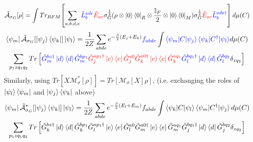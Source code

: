 \documentclass[aps,floatfix,10pt,amssymb,amsfont,amsmath,superscriptaddress,float,nofootinbib,longbibliography,nobalancelastpage,twocolumn]{revtex4-2}
\begin{document}
    \begin{equation}
    \tilde{\mathcal{A}}_{\sigma_G}[\rho] = \int Tr_{RFM}\!\left[\sum_{a,b,d,e}\textcolor{blue}{\tilde L^{ade}_b} \textcolor{red}{\tilde E_{ae}} \sigma_G^{\frac{1}{2}} (\rho\otimes \ket{0}\bra{0}_R \otimes \frac{\mathbb{I}_F}{2}\otimes \ket{0}\bra{0}_M) \sigma_G^{\frac{1}{2}}\textcolor{red}{\tilde E_{ae}}\textcolor{blue}{\tilde L^{ade\dagger}_b}\right] d\mu(C)
\end{equation}
\begin{multline}
    \bra{\psi_m}\tilde{\mathcal{A}}_{\sigma_G}[\ket{\psi_j}\bra{\psi_k}]\ket{\psi_l}=\frac{1}{2Z} \sum_{abde} e^{-\frac{\beta}{2}(E_j+E_k)}\textcolor{blue}{f_{abde}} \int \textcolor{blue}{\braket{\psi_m|C|\psi_j}\braket{\psi_k|C^{\dagger}|\psi_l}} d\mu(C)\\\sum_{p_1zq_1 q_2}Tr\left[\textcolor{blue}{\tilde G^{bz\dagger}_m\ket{d}\bra{d}\tilde G^{bp_1}_m} \textcolor{red}{\tilde G_j^{ap_1\dagger}\ket{e}\bra{e}\tilde G_j^{a0}\tilde G_k^{a0\dagger}\ket{e}\bra{e}\tilde G_k^{aq_1}} \textcolor{blue}{\tilde G^{bq_1\dagger}_l\ket{d}\bra{d}\tilde G^{bq_2}_l} \delta_{zq_2}\right]
    \label{eq:Arho}
\end{multline}
Similarly, using $Tr[X\mathcal{M}^*_{\sigma}[\rho]] = Tr[\mathcal{M}_{\sigma}[X]\rho]$, (i.e. exchanging the roles of $\ket{\psi_l}\bra{\psi_m}$ and $\ket{\psi_j}\bra{\psi_k}$ above)
\begin{multline}
   \bra{\psi_m}\tilde{\mathcal{A}}^*_{\sigma_G}[\ket{\psi_j}\bra{\psi_k}]\ket{\psi_l} =\frac{1}{2Z} \sum_{abde} e^{-\frac{\beta}{2}(E_l+E_m)}f_{abde} \int \braket{\psi_k|C|\psi_l}\braket{\psi_m|C^{\dagger}|\psi_j} d\mu(C)\\\sum_{p_1z q_1 q_2} Tr\left[\tilde G^{bz\dagger}_k\ket{d}\bra{d}\tilde G^{bp_1}_k\tilde G_l^{ap_1\dagger}\ket{e}\bra{e}\tilde G_l^{a0}\tilde G_m^{a0\dagger}\ket{e}\bra{e}\tilde G_m^{aq_1}\tilde G^{bq_1\dagger}_j\ket{d}\bra{d}\tilde G^{bq_2}_j  \delta_{zq_2}\right]
    \label{eq:A*rho}
\end{multline}
\end{document}
